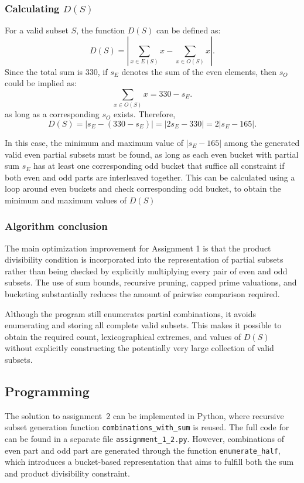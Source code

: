 \documentclass[11pt,a4paper]{article}
\begin{document}
\subsubsection*{Calculating $D(S)$}

For a valid subset $S$, the function $D(S)$ can be defined as:
\[
D(S)
=
\left|
\sum_{x\in E(S)}x-\sum_{x\in O(S)}x
\right|.
\]
Since the total sum is $330$, if $s_E$ denotes the sum of the even elements, then $s_O$ could be implied as:
\[
\sum_{x\in O(S)}x=330-s_E.
\]
as long as a corresponding $s_O$ exists.
Therefore,
\[
D(S)
=
|s_E-(330-s_E)|
=
|2s_E-330|
=
2|s_E-165|.
\]

In this case, the minimum and maximum value of $|s_E-165|$ among the generated valid even partial subsets must be found, as long as each even bucket with partial sum $s_E$ has at least one corresponding odd bucket that suffice all constraint if both even and odd parts are interleaved together. This can be calculated using a loop around even buckets and check corresponding odd bucket, to obtain the minimum and maximum values of $D(S)$

\subsubsection*{Algorithm conclusion}

The main optimization improvement for Assignment 1 is that the product divisibility condition is incorporated into the representation of partial subsets rather than being checked by explicitly multiplying every pair of even and odd subsets. The use of sum bounds, recursive pruning, capped prime
valuations, and bucketing substantially reduces the amount of pairwise comparison required.

Although the program still enumerates partial combinations, it avoids enumerating and storing all complete valid subsets. This makes it possible to obtain the required count, lexicographical extremes, and values of $D(S)$ without explicitly constructing the potentially very large collection of valid subsets.

\subsection*{Programming}

The solution to assignment~2 can be implemented in Python, where recursive subset generation function \texttt{combinations\_with\_sum} is reused. The full code for can be found in a separate file \texttt{assignment\_1\_2.py}. However, combinations of even part and odd part are generated through the function \texttt{enumerate\_half}, which introduces a bucket-based representation that aims to fulfill both the sum and product divisibility constraint.
\end{document}
